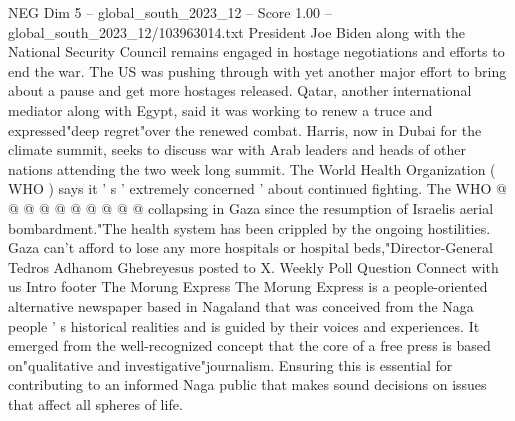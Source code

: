 \begin{textsample}{NEG Dim 5 – global\_south\_2023\_12 – Score 1.00 – global\_south\_2023\_12/103963014.txt}
President Joe Biden along with the National Security Council remains engaged in hostage negotiations and efforts to end the war.
The US was pushing through with yet another major effort to bring about a pause and get more hostages released.
Qatar, another international mediator along with Egypt, said it was working to renew a truce and expressed"deep regret"over the renewed combat.
Harris, now in Dubai for the climate summit, seeks to discuss war with Arab leaders and heads of other nations attending the two week long summit.
The World Health Organization ( WHO ) says it ' s ' extremely concerned ' about continued fighting.
The WHO @ @ @ @ @ @ @ @ @ @ collapsing in Gaza since the resumption of Israelis aerial bombardment."The health system has been crippled by the ongoing hostilities.
Gaza can't afford to lose any more hospitals or hospital beds,"Director-General Tedros Adhanom Ghebreyesus posted to X.
Weekly Poll Question Connect with us Intro footer The Morung Express The Morung Express is a people-oriented alternative newspaper based in Nagaland that was conceived from the Naga people ' s historical realities and is guided by their voices and experiences.
It emerged from the well-recognized concept that the core of a free press is based on"qualitative and investigative"journalism.
Ensuring this is essential for contributing to an informed Naga public that makes sound decisions on issues that affect all spheres of life.

\end{textsample}
